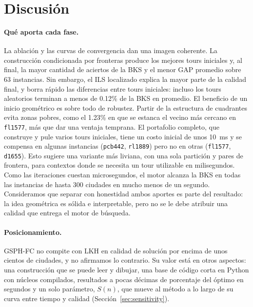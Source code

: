 \documentclass[runningheads]{llncs}
\begin{document}
\section{Discusión}
\label{sec:discussion}

\paragraph{Qué aporta cada fase.} La ablación y las curvas de
convergencia dan una imagen coherente. La construcción condicionada por
fronteras produce los mejores tours iniciales y, al final, la mayor
cantidad de aciertos de la BKS y el menor GAP promedio sobre 63
instancias. Sin embargo, el ILS localizado explica la mayor parte de la
calidad final, y borra rápido las diferencias entre tours iniciales:
incluso los tours aleatorios terminan a menos de 0.12\% de la BKS en
promedio. El beneficio de un inicio geométrico es sobre todo de
robustez. Partir de la estructura de cuadrantes evita zonas pobres, como
el 1.23\% en que se estanca el vecino más cercano en \texttt{fl1577}, más
que dar una ventaja temprana. El portafolio completo, que construye y
pule varios tours iniciales, tiene un costo inicial de unos 10~ms y se
compensa en algunas instancias (\texttt{pcb442}, \texttt{rl1889}) pero no
en otras (\texttt{fl1577}, \texttt{d1655}). Esto sugiere una variante
más liviana, con una sola partición y pares de frontera, para contextos
donde se necesita un tour utilizable en milisegundos. Como las
iteraciones cuestan microsegundos, el motor alcanza la BKS en todas las
instancias de hasta 300 ciudades en mucho menos de un segundo.
Consideramos que separar con honestidad ambos aportes es parte del
resultado: la idea geométrica es sólida e interpretable, pero no se le
debe atribuir una calidad que entrega el motor de búsqueda.

\paragraph{Posicionamiento.} GSPH-FC no compite con LKH en calidad de
solución por encima de unos cientos de ciudades, y no afirmamos lo
contrario. Su valor está en otros aspectos: una construcción que se puede
leer y dibujar, una base de código corta en Python con núcleos
compilados, resultados a pocas décimas de porcentaje del óptimo en
segundos y un solo parámetro, $S(n)$, que mueve al método a lo largo de
su curva entre tiempo y calidad (Sección~\ref{sec:sensitivity}).
\end{document}
